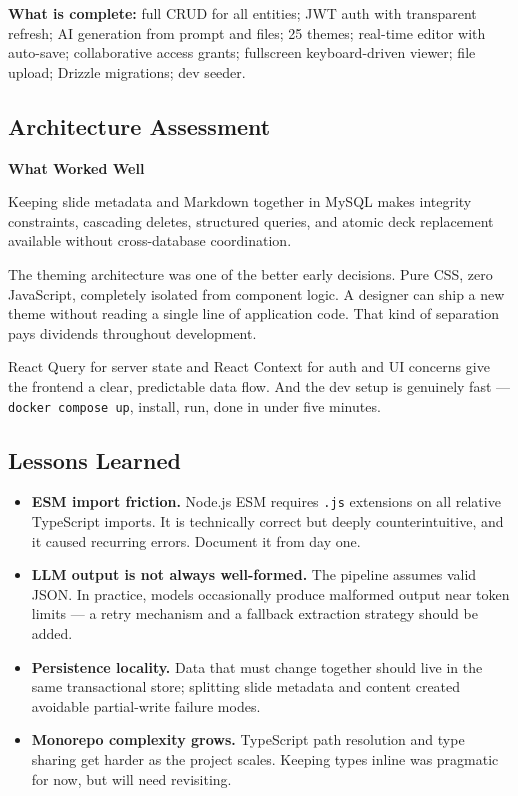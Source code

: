 \documentclass[10pt,a4paper]{article}
\begin{document}
\textbf{What is complete:} full CRUD for all entities; JWT auth with transparent refresh; AI generation from prompt and files; 25 themes; real-time editor with auto-save; collaborative access grants; fullscreen keyboard-driven viewer; file upload; Drizzle migrations; dev seeder.


\subsection{Architecture Assessment}

\textbf{What Worked Well}\par

Keeping slide metadata and Markdown together in MySQL makes integrity constraints,
cascading deletes, structured queries, and atomic deck replacement available
without cross-database coordination.

The theming architecture was one of the better early decisions. Pure CSS, zero JavaScript, completely isolated from component logic. A designer can ship a new theme without reading a single line of application code. That kind of separation pays dividends throughout development.

React Query for server state and React Context for auth and UI concerns give the frontend a clear, predictable data flow. And the dev setup is genuinely fast --- \texttt{docker compose up}, install, run, done in under five minutes.


\subsection{Lessons Learned}

\begin{itemize}[topsep=3pt, noitemsep]
  \item \textbf{ESM import friction.} Node.js ESM requires \texttt{.js} extensions on all relative TypeScript imports. It is technically correct but deeply counterintuitive, and it caused recurring errors. Document it from day one.
  \item \textbf{LLM output is not always well-formed.} The pipeline assumes valid JSON. In practice, models occasionally produce malformed output near token limits --- a retry mechanism and a fallback extraction strategy should be added.
  \item \textbf{Persistence locality.} Data that must change together should live in the same transactional store; splitting slide metadata and content created avoidable partial-write failure modes.
  \item \textbf{Monorepo complexity grows.} TypeScript path resolution and type sharing get harder as the project scales. Keeping types inline was pragmatic for now, but will need revisiting.
\end{itemize}
\end{document}
